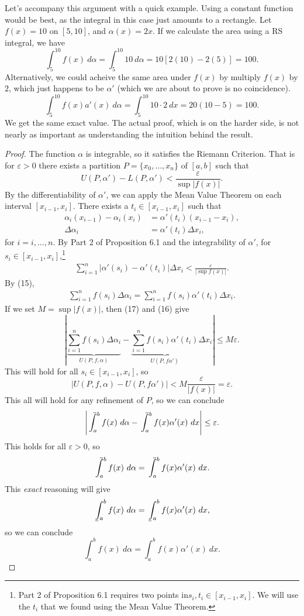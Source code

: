 \documentclass{article}
\def\upint{\mathchoice%
	{\mkern13mu\overline{\vphantom{\intop}\mkern7mu}\mkern-20mu}%
	{\mkern7mu\overline{\vphantom{\intop}\mkern7mu}\mkern-14mu}%
	{\mkern7mu\overline{\vphantom{\intop}\mkern7mu}\mkern-14mu}%
	{\mkern7mu\overline{\vphantom{\intop}\mkern7mu}\mkern-14mu}%
	\int}
\def\lowint{\mkern3mu\underline{\vphantom{\intop}\mkern7mu}\mkern-10mu\int}
\theoremstyle{definition}
\begin{document}
	Let's accompany this argument with a quick example. Using a constant function would be best, as the integral in this case just amounts to a rectangle. Let $ f(x)=10 $ on $ [5,10] $, and $ \alpha(x)=2x $. If we calculate the area using a RS integral, we have $$ \int_{5}^{10}f(x)\ d\alpha=\int_{5}^{10}10\ d\alpha=10[2(10)-2(5)]=100.$$ Alternatively, we could acheive the same area under $ f(x) $ by multiply $ f(x) $ by $ 2 $, which just happens to be $ \alpha' $ (which we are about to prove is no coincidence).
	$$ \int_{5}^{10}f(x)a'(x)\ d\alpha=\int_{5}^{10}10\cdot 2\ dx=20(10-5)=100.$$
	We get the same exact value. The actual proof, which is on the harder side, is not nearly as important as understanding the intuition behind the result. 
	\begin{proof}
		The function $ \alpha $ is integrable, so it satisfies the Riemann Criterion. That is for $ \varepsilon>0 $ there exists a partition $ P=\{x_0,\ldots,x_n\} $ of $ [a,b] $ such that $$ U(P,\alpha')-L(P,\alpha')<\frac{\varepsilon}{\sup |f(x)|}.$$ 
		By the differentiability of $ \alpha' $, we can apply the Mean Value Theorem on each interval $ [x_{i-1},x_i] $. There exists a $ t_i\in[x_{i-1},x_i] $ such that
		\begin{align}
			\alpha_i(x_{i-1})-\alpha_i(x_i)&=\alpha'(t_i)(x_{i-1}-x_i),\nonumber\\\Delta\alpha_i&=\alpha'(t_i)\Delta x_i,
		\end{align}
		for $ i=i,\ldots,n $. By Part 2 of Proposition 6.1 and the integrability of $ \alpha' $, for $ s_i\in [x_{i-1},x_i]$,\footnote{Part 2 of Proposition 6.1 requires two points in$ s_i,t_i\in [x_{i-1},x_i]$. We will use the $ t_i $ that we found using the Mean Value Theorem.}
		\begin{align}
			\sum_{i=1}^n|\alpha'(s_i)-\alpha'(t_i)|\Delta x_i<\frac{\varepsilon}{|\sup f(x)|}.
		\end{align}
		By (15), \begin{align}
			\sum_{i=1}^nf(s_i)\Delta \alpha_i=\sum_{i=1}^nf(s_i)\alpha'(t_i)\Delta x_i.
		\end{align}
		If we set $ M=\sup|f(x)| $, then (17) and (16) give $$ \left\lvert\underbrace{\sum_{i=1}^nf(s_i)\Delta \alpha_i}_{U(P,f,\alpha)}-\underbrace{\sum_{i=1}^nf(s_i)\alpha'(t_i)}_{U(P,f\alpha')}\Delta x_i \right\rvert\le M\varepsilon.$$ This will hold for all $ s_i\in[x_{i-1},x_i] $, so $$|U(P,f,\alpha)-U(P,f\alpha')|< M\frac{\varepsilon}{|f(x)|}=\varepsilon. $$ This all will hold for any refinement of $ P $, so we can conclude $$\left\lvert \upint_{a}^bf(x)\ d\alpha-\upint_{a}^bf(x)\alpha'(x)\ dx \right\rvert\le\varepsilon .$$ This holds for all $ \varepsilon>0 $, so $$  \upint_{a}^bf(x)\ d\alpha=\upint_{a}^bf(x)\alpha'(x)\ dx.$$ This \textit{exact} reasoning will give $$\lowint_{a}^bf(x)\ d\alpha=\lowint_{a}^bf(x)\alpha'(x)\ dx,$$ so we can conclude $$ \int_{a}^bf(x)\ d\alpha=\int_{a}^bf(x)\alpha'(x)\ dx.$$
	\end{proof}   
\end{document}
